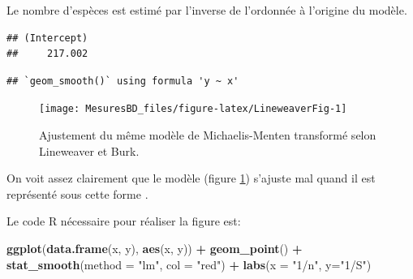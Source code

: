 \documentclass[
  11pt,
  french,
  a4paper,
  extrafontsizes,onecolumn,openright
  ]{memoir}
\newenvironment{Shaded}{\begin{snugshade}}{\end{snugshade}}
\newcommand{\DataTypeTok}[1]{\textcolor[rgb]{0.13,0.29,0.53}{#1}}
\newcommand{\DecValTok}[1]{\textcolor[rgb]{0.00,0.00,0.81}{#1}}
\newcommand{\KeywordTok}[1]{\textcolor[rgb]{0.13,0.29,0.53}{\textbf{#1}}}
\newcommand{\NormalTok}[1]{#1}
\newcommand{\OperatorTok}[1]{\textcolor[rgb]{0.81,0.36,0.00}{\textbf{#1}}}
\newcommand{\StringTok}[1]{\textcolor[rgb]{0.31,0.60,0.02}{#1}}
\begin{document}
Le nombre d'espèces est estimé par l'inverse de l'ordonnée à l'origine du modèle.

\scriptsize

\begin{Shaded}
\end{Shaded}

\begin{verbatim}
## (Intercept) 
##     217.002
\end{verbatim}

\normalsize



\scriptsize

\begin{verbatim}
## `geom_smooth()` using formula 'y ~ x'
\end{verbatim}

\begin{figure}

{\centering \texttt{[image: MesuresBD\_files/figure-latex/LineweaverFig-1]} 

}

\caption{Ajustement du même modèle de Michaelis-Menten transformé selon Lineweaver et Burk.}\label{fig:LineweaverFig}
\end{figure}

\normalsize

On voit assez clairement que le modèle (figure \ref{fig:LineweaverFig}) s'ajuste mal quand il est représenté sous cette forme \autocite{Raaijmakers1987}.

Le code R nécessaire pour réaliser la figure est:

\scriptsize

\begin{Shaded}
\begin{Highlighting}[]
\KeywordTok{ggplot}\NormalTok{(}\KeywordTok{data.frame}\NormalTok{(x, y), }\KeywordTok{aes}\NormalTok{(x, y)) }\OperatorTok{+}\StringTok{ }
\StringTok{  }\KeywordTok{geom_point}\NormalTok{() }\OperatorTok{+}
\StringTok{  }\KeywordTok{stat_smooth}\NormalTok{(}\DataTypeTok{method =} \StringTok{"lm"}\NormalTok{, }\DataTypeTok{col =} \StringTok{"red"}\NormalTok{) }\OperatorTok{+}
\StringTok{  }\KeywordTok{labs}\NormalTok{(}\DataTypeTok{x =} \StringTok{"1/n"}\NormalTok{, }\DataTypeTok{y=}\StringTok{"1/S"}\NormalTok{)}
\end{Highlighting}
\end{Shaded}
\end{document}
